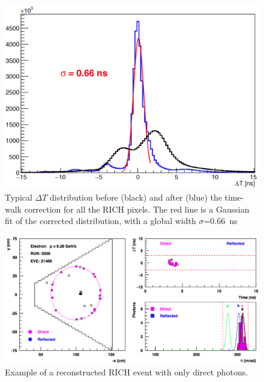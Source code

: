 \documentclass[5p,times,twocolumn]{elsarticle}
\def\dT{$\Delta T$ }
\begin{document}
\begin{figure}[h]
\begin{center}
\includegraphics[width=0.9\columnwidth]{Calibration_allch.png}
\end{center}
\caption{Typical \dT distribution before (black) and after (blue) the time-walk correction for all the RICH pixels.
The red line is a Gaussian fit of the corrected distribution, with a global width $\sigma$=0.66~ns}
\label{Fig:ResoTime}
\end{figure}

\onecolumn
\begin{figure}[t]
\begin{center}
\includegraphics[width=0.9\columnwidth]{Event_21488.png}
\end{center}
\caption{Example of a reconstructed RICH event with only direct photons.} 
\label{Fig:Event1}
\end{figure}
\end{document}
